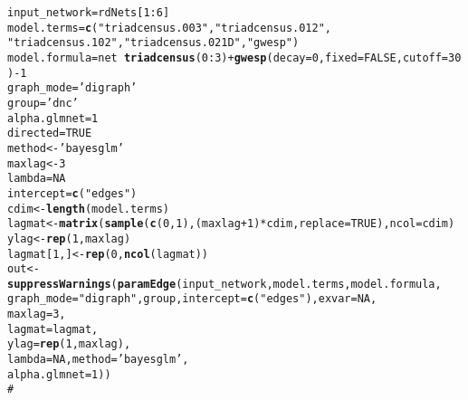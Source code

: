 \documentclass[12pt]{article}\usepackage[]{graphicx}\usepackage[]{color}
\makeatletter
\newcommand{\hlnum}[1]{\textcolor[rgb]{0.686,0.059,0.569}{#1}}%
\newcommand{\hlstr}[1]{\textcolor[rgb]{0.192,0.494,0.8}{#1}}%
\newcommand{\hlcom}[1]{\textcolor[rgb]{0.678,0.584,0.686}{\textit{#1}}}%
\newcommand{\hlopt}[1]{\textcolor[rgb]{0,0,0}{#1}}%
\newcommand{\hlstd}[1]{\textcolor[rgb]{0.345,0.345,0.345}{#1}}%
\newcommand{\hlkwb}[1]{\textcolor[rgb]{0.69,0.353,0.396}{#1}}%
\newcommand{\hlkwc}[1]{\textcolor[rgb]{0.333,0.667,0.333}{#1}}%
\newcommand{\hlkwd}[1]{\textcolor[rgb]{0.737,0.353,0.396}{\textbf{#1}}}%
\newenvironment{kframe}{%
 \def\at@end@of@kframe{}%
 \ifinner\ifhmode%
  \def\at@end@of@kframe{\end{minipage}}%
  \begin{minipage}{\columnwidth}%
 \fi\fi%
 \def\FrameCommand##1{\hskip\@totalleftmargin \hskip-\fboxsep
 \colorbox{shadecolor}{##1}\hskip-\fboxsep
     \hskip-\linewidth \hskip-\@totalleftmargin \hskip\columnwidth}%
 \MakeFramed {\advance\hsize-\width
   \@totalleftmargin\z@ \linewidth\hsize
   \@setminipage}}%
 {\par\unskip\endMakeFramed%
 \at@end@of@kframe}
\newenvironment{knitrout}{}{} %
\makeatother
\begin{document}
\begin{knitrout}
\color{fgcolor}\begin{kframe}
\begin{alltt}
\hlstd{input_network}\hlkwb{=}\hlstd{rdNets[}\hlnum{1}\hlopt{:}\hlnum{6}\hlstd{]}
\hlstd{model.terms}\hlkwb{=}\hlkwd{c}\hlstd{(}\hlstr{"triadcensus.003"}\hlstd{,} \hlstr{"triadcensus.012"}\hlstd{,}
              \hlstr{"triadcensus.102"}\hlstd{,} \hlstr{"triadcensus.021D"}\hlstd{,} \hlstr{"gwesp"}\hlstd{)}
\hlstd{model.formula} \hlkwb{=} \hlstd{net}\hlopt{~}\hlkwd{triadcensus}\hlstd{(}\hlnum{0}\hlopt{:}\hlnum{3}\hlstd{)}\hlopt{+}\hlkwd{gwesp}\hlstd{(}\hlkwc{decay} \hlstd{=} \hlnum{0}\hlstd{,} \hlkwc{fixed}\hlstd{=}\hlnum{FALSE}\hlstd{,} \hlkwc{cutoff}\hlstd{=}\hlnum{30}\hlstd{)}\hlopt{-}\hlnum{1}
\hlstd{graph_mode}\hlkwb{=}\hlstr{'digraph'}
\hlstd{group}\hlkwb{=}\hlstr{'dnc'}
\hlstd{alpha.glmnet}\hlkwb{=}\hlnum{1}
\hlstd{directed}\hlkwb{=}\hlnum{TRUE}
\hlstd{method} \hlkwb{<-} \hlstr{'bayesglm'}
\hlstd{maxlag} \hlkwb{<-} \hlnum{3}
\hlstd{lambda}\hlkwb{=}\hlnum{NA}
\hlstd{intercept} \hlkwb{=} \hlkwd{c}\hlstd{(}\hlstr{"edges"}\hlstd{)}
\hlstd{cdim} \hlkwb{<-} \hlkwd{length}\hlstd{(model.terms)}
\hlstd{lagmat} \hlkwb{<-} \hlkwd{matrix}\hlstd{(}\hlkwd{sample}\hlstd{(}\hlkwd{c}\hlstd{(}\hlnum{0}\hlstd{,}\hlnum{1}\hlstd{),(maxlag}\hlopt{+}\hlnum{1}\hlstd{)}\hlopt{*}\hlstd{cdim,}\hlkwc{replace} \hlstd{=} \hlnum{TRUE}\hlstd{),}\hlkwc{ncol} \hlstd{= cdim)}
\hlstd{ylag} \hlkwb{<-} \hlkwd{rep}\hlstd{(}\hlnum{1}\hlstd{,maxlag)}
\hlstd{lagmat[}\hlnum{1}\hlstd{,]} \hlkwb{<-} \hlkwd{rep}\hlstd{(}\hlnum{0}\hlstd{,}\hlkwd{ncol}\hlstd{(lagmat))}
\hlstd{out} \hlkwb{<-} \hlkwd{suppressWarnings}\hlstd{(}\hlkwd{paramEdge}\hlstd{(input_network,model.terms, model.formula,}
                \hlkwc{graph_mode}\hlstd{=}\hlstr{"digraph"}\hlstd{,group,}\hlkwc{intercept} \hlstd{=} \hlkwd{c}\hlstd{(}\hlstr{"edges"}\hlstd{),}\hlkwc{exvar}\hlstd{=}\hlnum{NA}\hlstd{,}
                \hlkwc{maxlag} \hlstd{=} \hlnum{3}\hlstd{,}
                \hlkwc{lagmat} \hlstd{= lagmat,}
                \hlkwc{ylag} \hlstd{=} \hlkwd{rep}\hlstd{(}\hlnum{1}\hlstd{,maxlag),}
                \hlkwc{lambda} \hlstd{=} \hlnum{NA}\hlstd{,} \hlkwc{method}\hlstd{=}\hlstr{'bayesglm'}\hlstd{,}
                \hlkwc{alpha.glmnet}\hlstd{=}\hlnum{1}\hlstd{))}
\hlcom{#}


\end{alltt}
\end{kframe}
\end{knitrout}
\end{document}
